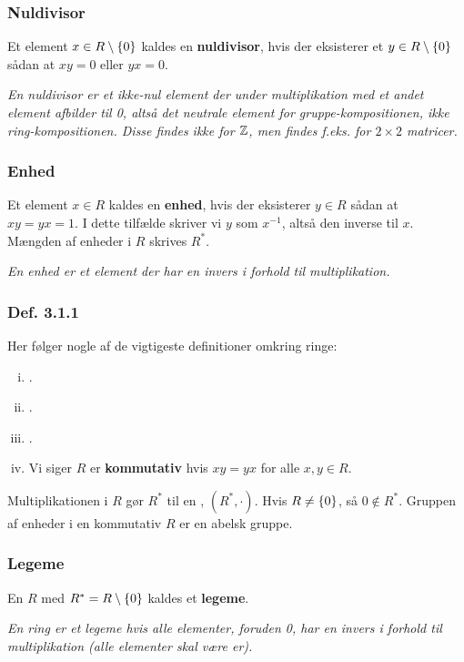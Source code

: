 \subsubsection{Nuldivisor}
\label{Nuldivisor}
Et element $x \in R \setminus \{ 0 \}$ kaldes en \textbf{nuldivisor}, hvis der
eksisterer et $y \in R \setminus \{ 0 \}$ sådan at $xy = 0$ eller $yx = 0$.

\textit{En nuldivisor er et ikke-nul element der under multiplikation med et
andet element afbilder til 0, altså det neutrale element for
gruppe-kompositionen, ikke ring-kompositionen. Disse findes ikke for $\mathbb{Z}$, men
findes f.eks. for $2\times2$ matricer.}

\subsubsection{Enhed}
\label{Enhed}
Et element $x \in R$ kaldes en \textbf{enhed}, hvis der eksisterer $y \in R$
sådan at $xy = yx = 1$. I dette tilfælde skriver vi $y$ som $x^{-1}$, altså den
inverse til $x$. Mængden af enheder i $R$ skrives $R^*$.

\textit{En enhed er et element der har en invers i forhold til multiplikation.}

\subsubsection{Def. 3.1.1}
\label{Def. 3.1.1}
Her følger nogle af de vigtigeste definitioner omkring ringe:
\begin{enumerate}[(i)]
  \item {}.
  \item {}.
  \item {}.
  \item Vi siger $R$ er \textbf{kommutativ} hvis $xy = yx$ for alle $x, y \in
  R$.
\end{enumerate}

Multiplikationen i $R$ gør $R^*$ til en , $(R^*, \cdot)$. Hvis
$R \neq \{ 0 \}$, så $0 \nin R^*$. Gruppen af enheder i en kommutativ
 $R$ er en abelsk gruppe.

\subsubsection{Legeme}
\label{Legeme}
En  $R$ med $R^* = R\setminus \{ 0 \}$ kaldes et
\textbf{legeme}.

\textit{En ring er et legeme hvis alle elementer, foruden 0, har en invers i
forhold til multiplikation (alle elementer skal være er).}

